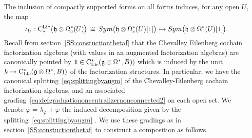 \documentclass[11pt]{amsart}
\numberwithin{equation}{section}
\begin{document}
The inclusion  of compactly supported forms on all forms induces, for any open $U$,  the  map
\begin{equation}
 \label{eq:incofcpctforms} 
\iota_U: {\rm C}^{\rm Lie}_*\big(\mathfrak h \otimes \Omega^*_c(U)\big) \, \cong \, 
Sym\big( \mathfrak h\otimes  \Omega^*_c (U) [1]\big) \hookrightarrow  
Sym\big( \mathfrak h\otimes  \Omega^* (U) [1]\big).
\end{equation}
Recall from section~\ref{SS:constuctionthetaf} that the Chevalley Eilenberg cochain factorization algebras (with values in an augmented factorization 
algebras) 
are canonically pointed  by $\mathbf{1}\in {\rm C}_{\rm Lie}^*(\mathfrak g\otimes \Omega^*, B) )$ which is induced by 
the unit $k\to {\rm C}_{\rm Lie}^*(\mathfrak g\otimes \Omega^*, B) )$
 of the factorization structures.  In particular, we have the canonical splitting~\eqref{eq:splittingbyaugm} 
of the  Chevalley-Eilenberg cochain factorization algebras, and an associated grading~\eqref{eq:defgraduationoncentralizernonconnected2} on each open
set. We denote $\varphi= \lambda_\varphi +\overline{\varphi}$ the induced decomposition given by the splitting~\eqref{eq:splittingbyaugm} . 
We use these gradings as in section~\ref{SS:constuctionthetaf} to construct a composition as follows. 
\end{document}

